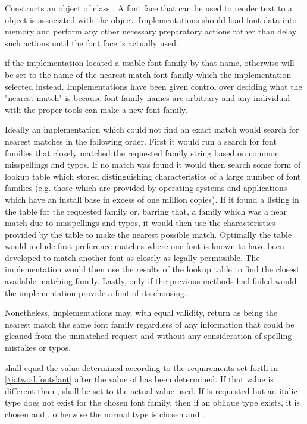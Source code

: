 \begin{itemdescr}
	\pnum
	\effects
	Constructs an object of class . A font face that can be used to render text to a  object is associated with the object. Implementations should load font data into memory and perform any other necessary preparatory actions rather than delay such actions until the font face is actually used.
	
	\pnum
	\postconditions
	 if the implementation located a usable font family by that name, otherwise  will be set to the name of the  nearest match font family which the implementation selected instead.
	\enternote
	Implementations have been given control over deciding what the "nearest match" is because font family names are arbitrary and any individual with the proper tools can make a new font family.
	
	Ideally an implementation which could not find an exact match would search for nearest matches in the following order. First it would run a search for font families that closely matched the requested family string based on common misspellings and typos. If no match was found it would then search some form of lookup table which stored distinguishing characteristics of a large number of font families (e.g. those which are provided by operating systems and applications which have an install base in excess of one million copies). If it found a listing in the table for the requested family or, barring that, a family which was a near match due to misspellings and typos, it would then use the characteristics provided by the table to make the nearest possible match. Optimally the table would include first preference matches where one font is known to have been developed to match another font as closely as legally permissible. The implementation would then use the results of the lookup table to find the closest available matching family. Lastly, only if the previous methods had failed would the implementation provide a font of its choosing.
	
	Nonetheless, implementations may, with equal validity, return as being the nearest match the same font family regardless of any information that could be gleaned from the unmatched request and without any consideration of spelling mistakes or typos.
	\exitnote
	
	\pnum
	 shall equal the value determined according to the requirements set forth in \ref{\iotwod.fontslant} after the value of  has been determined. If that  value is different than ,  shall be set to the actual value used.
	\enterexample
	If  is requested but an italic type does not exist for the chosen font family, then if an oblique type exists, it is chosen and , otherwise the normal type is chosen and .
	\exitexample
	

\end{itemdescr}

